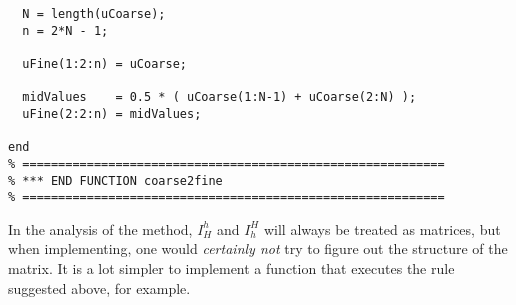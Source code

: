 \begin{example}[Multigrid]
\begin{lstlisting}
  N = length(uCoarse);
  n = 2*N - 1;

  uFine(1:2:n) = uCoarse;

  midValues    = 0.5 * ( uCoarse(1:N-1) + uCoarse(2:N) );
  uFine(2:2:n) = midValues;

end
% ===========================================================
% *** END FUNCTION coarse2fine
% ===========================================================
\end{lstlisting}


In the analysis of the method, $I_H^h$ and $I_h^H$ will always be treated as matrices, but when implementing, one would \emph{certainly not} try to figure out the structure of the matrix. It is a lot simpler to implement a function that executes the rule suggested above, for example.
\end{example}


